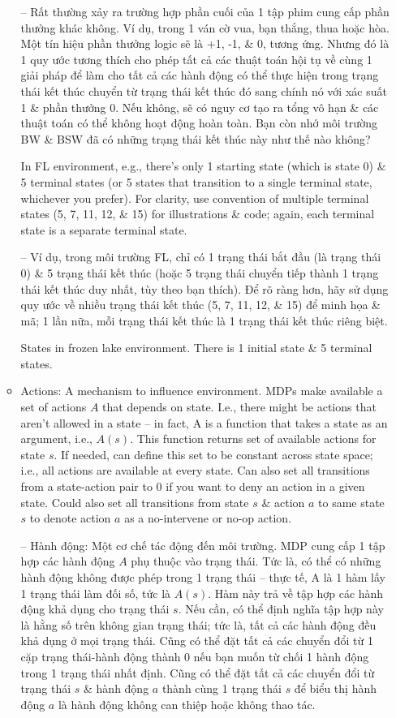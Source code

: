 \documentclass{article}
\begin{document}
\begin{itemize}
\begin{itemize}
        -- Rất thường xảy ra trường hợp phần cuối của 1 tập phim cung cấp phần thưởng khác không. Ví dụ, trong 1 ván cờ vua, bạn thắng, thua hoặc hòa. Một tín hiệu phần thưởng logic sẽ là +1, -1, \& 0, tương ứng. Nhưng đó là 1 quy ước tương thích cho phép tất cả các thuật toán hội tụ về cùng 1 giải pháp để làm cho tất cả các hành động có thể thực hiện trong trạng thái kết thúc chuyển từ trạng thái kết thúc đó sang chính nó với xác suất 1 \& phần thưởng 0. Nếu không, sẽ có nguy cơ tạo ra tổng vô hạn \& các thuật toán có thể không hoạt động hoàn toàn. Bạn còn nhớ môi trường BW \& BSW đã có những trạng thái kết thúc này như thế nào không?

        In FL environment, e.g., there's only 1 starting state (which is state 0) \& 5 terminal states (or 5 states that transition to a single terminal state, whichever you prefer). For clarity, use convention of multiple terminal states (5, 7, 11, 12, \& 15) for illustrations \& code; again, each terminal state is a separate terminal state.

        -- Ví dụ, trong môi trường FL, chỉ có 1 trạng thái bắt đầu (là trạng thái 0) \& 5 trạng thái kết thúc (hoặc 5 trạng thái chuyển tiếp thành 1 trạng thái kết thúc duy nhất, tùy theo bạn thích). Để rõ ràng hơn, hãy sử dụng quy ước về nhiều trạng thái kết thúc (5, 7, 11, 12, \& 15) để minh họa \& mã; 1 lần nữa, mỗi trạng thái kết thúc là 1 trạng thái kết thúc riêng biệt.

        {\sf States in frozen lake environment.} There is 1 initial state \& 5 terminal states.
        \item {\sf Actions: A mechanism to influence environment.} MDPs make available a set of actions $A$ that depends on state. I.e., there might be actions that aren't allowed in a state -- in fact, A is a function that takes a state as an argument, i.e., $A(s)$. This function returns set of available actions for state $s$. If needed, can define this set to be constant across state space; i.e., all actions are available at every state. Can also set all transitions from a state-action pair to 0 if you want to deny an action in a given state. Could also set all transitions from state $s$ \& action $a$ to same state $s$ to denote action $a$ as a no-intervene or no-op action.

        -- {\sf Hành động: Một cơ chế tác động đến môi trường.} MDP cung cấp 1 tập hợp các hành động $A$ phụ thuộc vào trạng thái. Tức là, có thể có những hành động không được phép trong 1 trạng thái -- thực tế, A là 1 hàm lấy 1 trạng thái làm đối số, tức là $A(s)$. Hàm này trả về tập hợp các hành động khả dụng cho trạng thái $s$. Nếu cần, có thể định nghĩa tập hợp này là hằng số trên không gian trạng thái; tức là, tất cả các hành động đều khả dụng ở mọi trạng thái. Cũng có thể đặt tất cả các chuyển đổi từ 1 cặp trạng thái-hành động thành 0 nếu bạn muốn từ chối 1 hành động trong 1 trạng thái nhất định. Cũng có thể đặt tất cả các chuyển đổi từ trạng thái $s$ \& hành động $a$ thành cùng 1 trạng thái $s$ để biểu thị hành động $a$ là hành động không can thiệp hoặc không thao tác.


\end{itemize}
\end{itemize}
\end{document}
